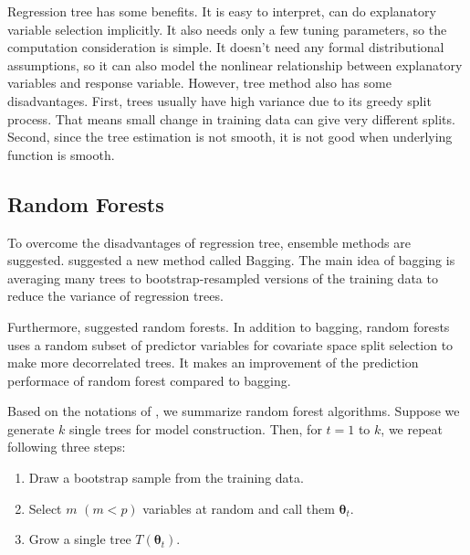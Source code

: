 \documentclass[11pt,titlepage]{article}
\begin{document}
	Regression tree has some benefits. It is easy to interpret, can do explanatory variable selection implicitly. It also needs only a few tuning parameters, so the computation consideration is simple. It doesn't need any formal distributional assumptions, so it can also model  the nonlinear relationship between explanatory variables and response variable. %
	However, tree method also has some disadvantages. First, trees usually have high variance due to its greedy split process. That means small change in training data can give very different splits. Second, since the tree estimation is not smooth, it is not good when underlying function is smooth. %
	
	\subsection{Random Forests}
	
	To overcome the disadvantages of regression tree, ensemble methods are suggested. \citep{Breiman1996} suggested a new method called Bagging. The main idea of bagging is averaging many trees to bootstrap-resampled versions of the training data to reduce the variance of regression trees.
	
	Furthermore, \citep{Breiman2001} suggested random forests. In addition to bagging, random forests uses a random subset of predictor variables for covariate space split selection to make more decorrelated trees. It makes an improvement of the prediction performace of random forest compared to bagging.
	
	Based on the notations of \citep{Meinshausen2006}, we summarize random forest algorithms. Suppose we generate $k$ single trees for model construction. Then, for $t=1$ to $k$, we repeat following three steps:
	
	\begin{enumerate}
		\item Draw a bootstrap sample from the training data.
		\item Select $m$ $(m < p)$ variables at random and call them $\boldsymbol{\theta}_{t}$.
		\item Grow a single tree $T(\boldsymbol{\theta}_{t})$.
	\end{enumerate}
\end{document}

